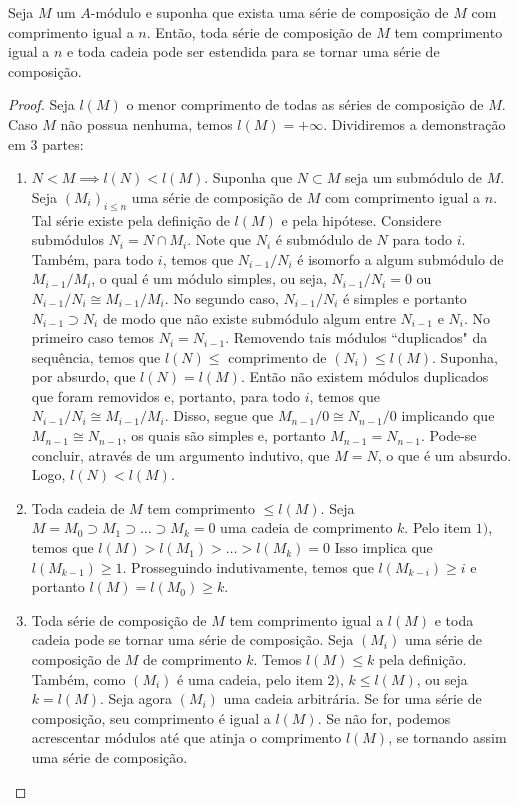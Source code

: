 \begin{proposition}
	\label{loc:6.7_:_unicidade_do_tamanho_das_séries_de_composição}
	Seja $M$ um $A$-módulo e suponha que exista uma série de composição de $M$ com comprimento igual a $n$.
	Então, toda série de composição de $M$ tem comprimento igual a $n$ e toda cadeia pode ser estendida para se tornar uma série de composição.
	\begin{proof}

		Seja $l(M)$ o menor comprimento de todas as séries de composição de $M$. Caso $M$ não possua nenhuma, temos $l(M)=+\infty$.
		Dividiremos a demonstração em 3 partes:
		\begin{enumerate}
			\item $N < M \implies l(N) < l(M)$.
			      Suponha que $N \subset M$ seja um submódulo de $M$. Seja $(M_{i})_{i\leq n}$ uma série de composição de $M$ com comprimento igual a $n$. Tal série existe pela definição de $l(M)$ e pela hipótese.
			      Considere submódulos $N_{i}=N \cap M_{i}$. Note que $N_{i}$ é submódulo de $N$ para todo $i$.
			      Também, para todo $i$, temos que $N_{i-1}/N_{i}$ é isomorfo a algum submódulo de $M_{i-1}/M_{i}$, o qual é um módulo simples, ou seja, $N_{i-1}/N_{i} = 0$ ou $N_{i-1}/N_{i} \cong M_{i-1}/M_{i}$. No segundo caso, $N_{i-1}/N_{i}$ é simples e portanto $N_{i-1}\supset N_{i}$ de modo que não existe submódulo algum entre $N_{i-1}$ e $N_{i}$. No primeiro caso temos $N_{i}=N_{i-1}$.  Removendo tais módulos ``duplicados" da sequência, temos que $l(N) \leq$ comprimento de $(N_{i}) \leq l(M)$.
			      Suponha, por absurdo, que $l(N)=l(M)$. Então não existem módulos duplicados que foram removidos e, portanto, para todo $i$, temos que $N_{i-1}/N_{i} \cong M_{i-1}/M_{i}$.
			      Disso, segue que $M_{n-1}/0 \cong N_{n-1}/0$ implicando que $M_{n-1} \cong N_{n-1}$, os quais são simples e, portanto $M_{n-1}=N_{n-1}$. Pode-se concluir, através de um argumento indutivo, que $M=N$, o que é um absurdo. Logo, $l(N)<l(M)$.
			\item Toda cadeia de $M$ tem comprimento $\leq l(M)$.
			      Seja $M=M_{0}\supset M_{1}\supset\dots \supset M_{k}=0$ uma cadeia de comprimento $k$.
			      Pelo item $1)$, temos que $l(M)>l(M_{1})>\dots>l(M_{k})=0$
			      Isso implica que $l(M_{k-1})\geq1$. Prosseguindo indutivamente, temos que $l(M_{k-i})\geq i$ e portanto $l(M) = l(M_{0})\geq k$.
			\item Toda série de composição de $M$ tem comprimento igual a $l(M)$ e toda cadeia pode se tornar uma série de composição.
			      Seja $(M_{i})$ uma série de composição de $M$ de comprimento $k$. Temos $l(M)\leq k$ pela definição.
			      Também, como $(M_{i})$ é uma cadeia, pelo item $2)$, $k\leq l(M)$, ou seja $k=l(M)$.
			      Seja agora $(M_{i})$ uma cadeia arbitrária. Se for uma série de composição, seu comprimento é igual a $l(M)$. Se não for, podemos acrescentar módulos até que atinja o comprimento $l(M)$, se tornando assim uma série de composição.
		\end{enumerate}
	\end{proof}
\end{proposition}
